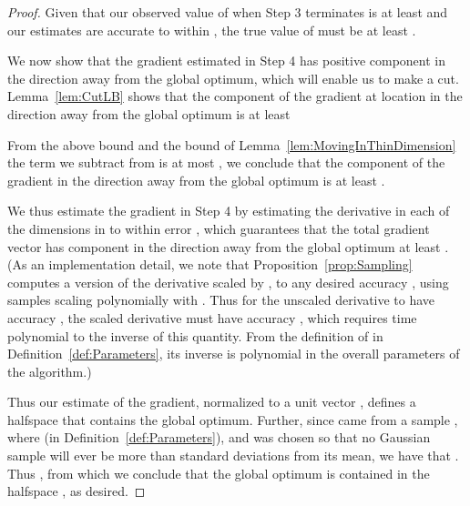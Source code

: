 \documentclass[11pt,letter]{article}
\numberwithin{nTheorems}{section}
\begin{document}
\begin{proof}
Given that our observed value of  when Step 3 terminates is at least  and our estimates are accurate to within , the true value of  must be at least .

We now show that the gradient  estimated in Step 4 has positive component in the direction away from the global optimum, which will enable us to make a cut. Lemma~\ref{lem:CutLB} shows that the component of the gradient at location  in the direction away from the global optimum is at least 

From the above bound  and the bound of Lemma~\ref{lem:MovingInThinDimension} the term we subtract from  is at most , we conclude that the component of the gradient in the direction away from the global optimum is at least .

We thus estimate the gradient in Step 4 by estimating the derivative in each of the dimensions in  to within error , which guarantees that the total gradient vector has component in the direction away from the global optimum at least . (As an implementation detail, we note that Proposition~\ref{prop:Sampling} computes a version of the derivative scaled by , to any desired accuracy , using samples scaling polynomially with . Thus for the unscaled derivative to have accuracy , the scaled derivative must have accuracy , which requires time polynomial to the inverse of this quantity. From the definition of  in Definition~\ref{def:Parameters}, its inverse is polynomial in the overall parameters of the algorithm.)

Thus our estimate of the gradient, normalized to a unit vector , defines a halfspace  that contains the global optimum. Further, since  came from a sample , where  (in Definition~\ref{def:Parameters}), and  was chosen so that no Gaussian sample will ever be more than  standard deviations from its mean, we have that . Thus , from which we conclude that the global optimum is contained in the halfspace , as desired.


\end{proof}


\fi
\end{document}
